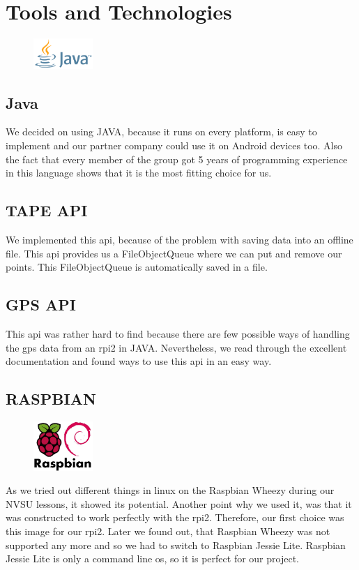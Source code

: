 \chapter{Tools and Technologies}
\begin{figure}
  \begin{center}
    \includegraphics[width=0.2\textwidth] {bilder/java}
  \end{center}
\end{figure}
\section{Java}
We decided on using JAVA, because it runs on every platform, is easy to implement and our partner company could use it on Android devices too. Also the fact that every member of the group got 5 years of programming experience in this language shows that it is the most fitting choice for us.

\section{TAPE API}
We implemented this \gls{api}, because of the problem with saving data into an offline file. This \gls{api} provides us a FileObjectQueue where we can put and remove our points. This FileObjectQueue is automatically saved in a file.

\section{GPS API}
This \gls{api} was rather hard to find because there are few possible ways of handling the \gls{gps} data from an \gls{rpi2} in JAVA. Nevertheless, we read through the excellent documentation and found ways to use this \gls{api} in an easy way.

\section{RASPBIAN}
\begin{figure}
  \begin{center}
    \includegraphics[width=0.2\textwidth] {bilder/raspbian}
  \end{center}
\end{figure}
As we tried out different things in linux on the Raspbian Wheezy during our NVSU lessons, it showed its potential. Another point why we used it, was that it was constructed to work perfectly with the \gls{rpi2}. Therefore, our first choice was this image for our \gls{rpi2}. Later we found out, that Raspbian Wheezy was not supported any more and so we had to switch to Raspbian Jessie Lite. Raspbian Jessie Lite is only a command line \gls{os}, so it is perfect for our project.

